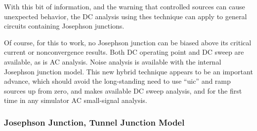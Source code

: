 With this bit of information, and the warning that controlled sources
can cause unexpected behavior, the DC analysis using thes technique
can apply to general circuits containing Josephson junctions.

Of course, for this to work, no Josephson junction can be biased above
its critical current or nonconvergence results.  Both DC operating
point and DC sweep are available, as is AC analysis.  Noise analysis
is available with the internal Josephson junction model.  This new
hybrid technique appears to be an important advance, which should
avoid the long-standing need to use ``{\vt uic}'' and ramp sources up
from zero, and makes available DC sweep analysis, and for the first
time in any simulator AC small-signal analysis.


\subsubsection{Josephson Junction, Tunnel Junction Model}



